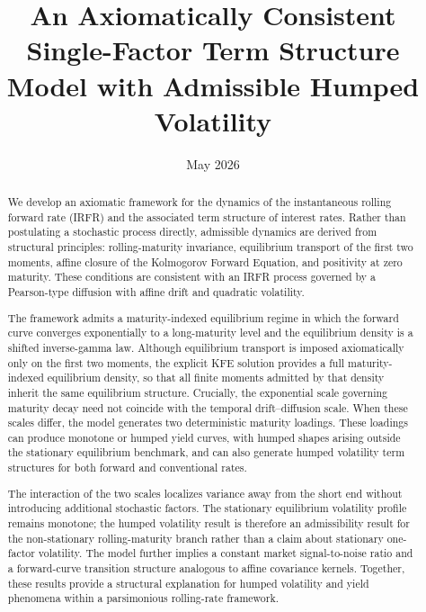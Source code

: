 \documentclass[12pt]{article}
\title{An Axiomatically Consistent Single-Factor Term Structure Model with Admissible Humped Volatility}
\date{May 2026}
\theoremstyle{statementstyle}
\begin{document}
\maketitle
\vspace{-1.0em}


\begin{abstract}
We develop an axiomatic framework for the dynamics of the instantaneous rolling forward rate (IRFR) and the associated term structure of interest rates. Rather than postulating a stochastic process directly, admissible dynamics are derived from structural principles: rolling-maturity invariance, equilibrium transport of the first two moments, affine closure of the Kolmogorov Forward Equation, and positivity at zero maturity. These conditions are consistent with an IRFR process governed by a Pearson-type diffusion with affine drift and quadratic volatility.

The framework admits a maturity-indexed equilibrium regime in which the forward curve converges exponentially to a long-maturity level and the equilibrium density is a shifted inverse-gamma law. Although equilibrium transport is imposed axiomatically only on the first two moments, the explicit KFE solution provides a full maturity-indexed equilibrium density, so that all finite moments admitted by that density inherit the same equilibrium structure. Crucially, the exponential scale governing maturity decay need not coincide with the temporal drift--diffusion scale. When these scales differ, the model generates two deterministic maturity loadings. These loadings can produce monotone or humped yield curves, with humped shapes arising outside the stationary equilibrium benchmark, and can also generate humped volatility term structures for both forward and conventional rates.

The interaction of the two scales localizes variance away from the short end without introducing additional stochastic factors. The stationary equilibrium volatility profile remains monotone; the humped volatility result is therefore an admissibility result for the non-stationary rolling-maturity branch rather than a claim about stationary one-factor volatility. The model further implies a constant market signal-to-noise ratio and a forward-curve transition structure analogous to affine covariance kernels. Together, these results provide a structural explanation for humped volatility and yield phenomena within a parsimonious rolling-rate framework.
\end{abstract}
\end{document}
